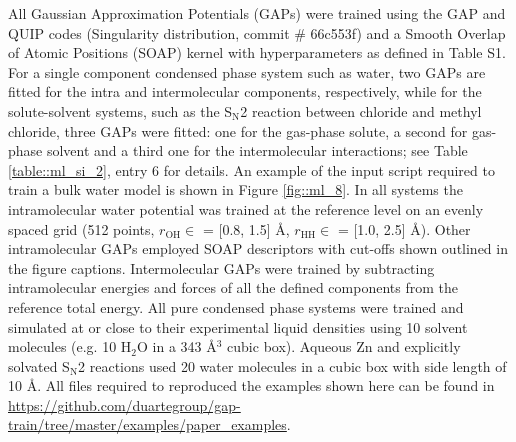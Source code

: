 \documentclass[../../main.tex]{subfiles}
\begin{document}
All Gaussian Approximation Potentials (GAPs) were trained using the GAP and QUIP codes (Singularity distribution, commit \# 66c553f) and a Smooth Overlap of Atomic Positions (SOAP)\cite{Bartok2013} kernel with hyperparameters as defined in Table S1. For a single component condensed phase system such as water, two GAPs are fitted for the intra and intermolecular components, respectively, while for the solute-solvent systems, such as the S${}_\text{N}$2 reaction between chloride and methyl chloride, three GAPs were fitted: one for the gas-phase solute, a second for gas-phase solvent and a third one for the intermolecular interactions; see Table \ref{table::ml_si_2}, entry 6 for details. An example of the input script required to train a bulk water model is shown in Figure \ref{fig::ml_8}. In all systems the intramolecular water potential was trained at the reference level on an evenly spaced grid (512 points, $r_\text{OH} \in$ = [0.8, 1.5] \AA, $r_\text{HH}\in$ = [1.0, 2.5] \AA). Other intramolecular GAPs employed SOAP descriptors with cut-offs shown outlined in the figure captions. Intermolecular GAPs were trained by subtracting intramolecular energies and forces of all the defined components from the reference total energy. All pure condensed phase systems were trained and simulated at or close to their experimental liquid densities using 10 solvent molecules (e.g. 10 H${}_2$O in a 343 \AA${}^3$ cubic box). Aqueous Zn and explicitly solvated S${}_\text{N}$2 reactions used 20 water molecules in a cubic box with side length of 10 \AA. All files required to reproduced the examples shown here can be found in {\url{https://github.com/duartegroup/gap-train/tree/master/examples/paper_examples}}.
\end{document}
